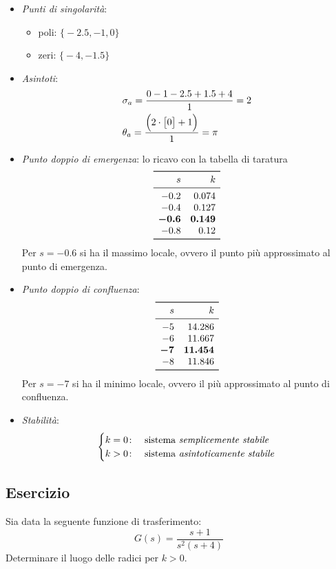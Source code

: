 \begin{itemize}
	\item \emph{Punti di singolarità}:
		\begin{itemize}
			\item poli: \(\bigl\{ -2.5, -1, 0 \bigr\}\)
			\item zeri: \(\bigl\{ -4, -1.5 \bigr\}\)
		\end{itemize}
	\item \emph{Asintoti}:
		\begin{align*}
			& \sigma_a = \frac{0-1-2.5+1.5+4}{1} = 2 \\
			& \theta_a = \frac{\Bigl( 2 \cdot \bigl[0\bigr] +1 \Bigl)}{1} = \pi
		\end{align*}
	\item \emph{Punto doppio di emergenza}:
		lo ricavo con la tabella di taratura
		\[\begin{array}{rr}
			\toprule
			s & k \\
			\midrule
			-0.2 & 0.074 \\
			-0.4 & 0.127 \\
			\bm{-0.6} & \bm{0.149} \\
			-0.8 & 0.12 \\
			\bottomrule
		\end{array}\]
		Per \(s = -0.6\) si ha il massimo locale, ovvero il punto più
		approssimato al punto di emergenza.
	\item \emph{Punto doppio di confluenza}:
		\[\begin{array}{rr}
			\toprule
			s & k \\
			\midrule
			-5 & 14.286 \\
			-6 & 11.667 \\
			\bm{-7} & \bm{11.454} \\
			-8 & 11.846 \\
			\bottomrule
		\end{array}\]
		Per \(s = -7\) si ha il minimo locale, ovvero il più approssimato
		al punto di confluenza.
	\item \emph{Stabilità}:
		\[\begin{cases}
			k = 0\colon & \text{sistema \emph{semplicemente stabile}} \\
			k > 0\colon & \text{sistema \emph{asintoticamente stabile}}
		\end{cases}\]
\end{itemize}


\subsection{Esercizio}
Sia data la seguente funzione di trasferimento:
\[
	G(s) = \frac{s+1}{s^2 (s+4)}
\]
Determinare il luogo delle radici per \(k>0\).

